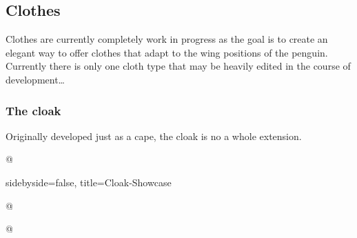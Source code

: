 \documentclass[parskip=half,english,numbers=noenddot,footnotes=nomultiple,oneside]{scrartcl}
\begin{document}
\subsection{Clothes}

Clothes are currently completely work in progress as the goal is to create an elegant way to offer clothes that adapt to the wing positions of the penguin.
Currently there is only one cloth type that may be heavily edited in the course of development\ldots

\subsubsection{The cloak}

Originally developed just as a cape, the cloak is no a whole extension.

\begin{tcblisting}{@}
\begin{tikzpicture}
	\pingu[cloak=green]
\end{tikzpicture}
\end{tcblisting}
\endkeyexplain

\begin{tcblisting}{sidebyside=false, title=Cloak-Showcase}
\end{tcblisting}

{\def\pingu@color@cloak{<cloak-color>}
\begin{tcblisting}{@}
\begin{tikzpicture}
	\pingu[cloak, cloak cap=green]
\end{tikzpicture}
\end{tcblisting}
\endsubkeyexplain}

{\def\pingu@color@cloak{<cloak-color>}
\begin{tcblisting}{@}
\begin{tikzpicture}
	\pingu[cloak, cloak wings color=green]
\end{tikzpicture}
\end{tcblisting}
\endsubkeyexplain}
\end{document}
